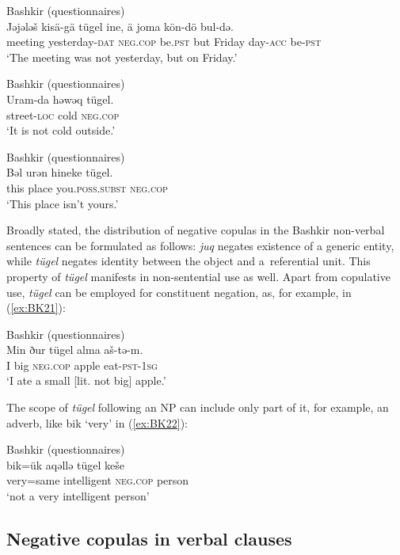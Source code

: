 \documentclass[output=paper]{langsci/langscibook}
\begin{document}
\ea Bashkir (questionnaires) \label{ex:BK18}\\
	\gll Jəjələš	kisä-gä				tügel			ine,		ä		joma    kön-dö	bul-də.\\
	meeting	yesterday-\textsc{dat}		\textsc{neg.cop}		be.\textsc{pst}	but	Friday  day-\textsc{acc}	be-\textsc{pst}\\
	\glt `The meeting was not yesterday, but on Friday.'
\z

\ea Bashkir (questionnaires) \label{ex:BK19}\\
	\gll Uram-da		həwəq	tügel.\\
	street-\textsc{loc}	cold		\textsc{neg.cop}\\
	\glt `It is not cold outside.'
\z

\ea Bashkir (questionnaires) \label{ex:BK20}\\
	\gll Bəl		urən	hineke				tügel.\\
	this	place	you.\textsc{poss.subst}	\textsc{neg.cop}\\
	\glt `This place isn’t yours.'
\z


Broadly stated, the distribution of negative copulas in the Bashkir non-verbal sentences can be formulated as follows: \textit{juq} negates existence of a generic entity, while \textit{tügel} negates identity between the object and a referential unit. This property of \textit{tügel} manifests in non-sentential use as well. Apart from copulative use, \textit{tügel} can be employed for constituent negation, as, for example, in (\ref{ex:BK21}):

\ea Bashkir (questionnaires) \label{ex:BK21}\\
	\gll Min	ður	tügel			alma		aš-tə-m.\\
	I		big	\textsc{neg.cop}		apple		eat-\textsc{pst-1sg}\\
	\glt `I ate a small [lit. not big] apple.'
\z

The scope of \textit{tügel} following an NP can include only part of it, for example, an adverb, like bik ‘very’ in (\ref{ex:BK22}):

\ea Bashkir (questionnaires) \label{ex:BK22}\\
	\gll bik=ük		aqəllə		tügel			keše\\
	very=same	intelligent	\textsc{neg.cop}		person\\
	\glt `not a very intelligent person'
\z

\subsection{Negative copulas in verbal clauses}\label{sec:BK2.3}
\end{document}
